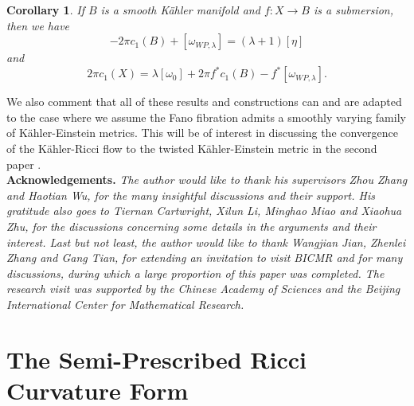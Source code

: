 \documentclass[12pt]{article}
\newtheorem{corollary}[theorem]{Corollary}
\numberwithin{equation}{section}
\begin{document}
\begin{corollary}
If $B$ is a smooth K\"ahler manifold and $f: X \to B$ is a submersion, then we have
\begin{equation*}
    -2\pi c_1(B) + [\omega_{WP,\lambda}] = (\lambda + 1)[\eta]
\end{equation*}
and
\begin{equation*}
    2 \pi c_1(X) = \lambda [\omega_0] + 2 \pi f^* c_1(B) - f^*[\omega_{WP,\lambda}].
\end{equation*}
\end{corollary}

\noindent We also comment that all of these results and constructions can and are adapted to the case where we assume the Fano fibration admits a smoothly varying family of K\"ahler-Einstein metrics. This will be of interest in discussing the convergence of the K\"ahler-Ricci flow to the twisted K\"ahler-Einstein metric in the second paper \cite{B25}.\\

\noindent \textbf{Acknowledgements.} \textit{The author would like to thank his supervisors Zhou Zhang and Haotian Wu, for the many insightful discussions and their support. His gratitude also goes to Tiernan Cartwright, Xilun Li, Minghao Miao and Xiaohua Zhu, for the discussions concerning some details in the arguments and their interest. Last but not least, the author would like to thank Wangjian Jian, Zhenlei Zhang and Gang Tian, for extending an invitation to visit BICMR and for many discussions, during which a large proportion of this paper was completed. The research visit was supported by the Chinese Academy of Sciences and the Beijing International Center for Mathematical Research.}

\section{The Semi-Prescribed Ricci Curvature Form}
\end{document}

